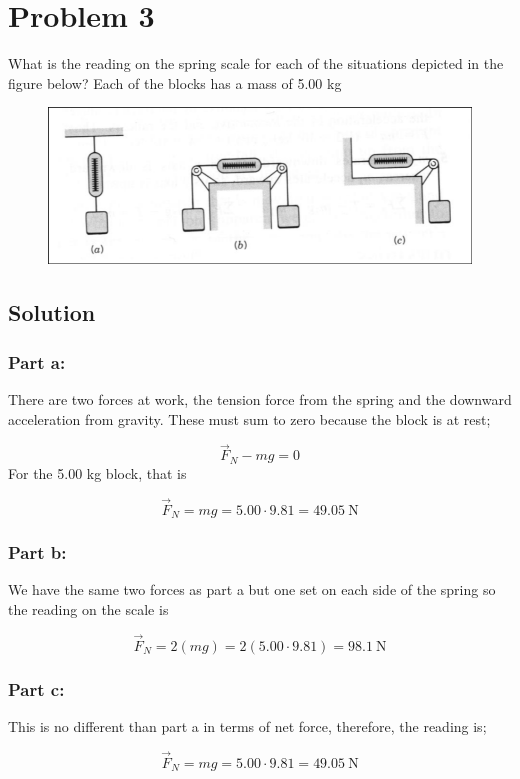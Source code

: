 \documentclass{article}
\begin{document}
\section*{Problem 3}
What is the reading on the spring scale for each of the situations depicted in the figure below? Each of the
blocks has a mass of 5.00 kg
\begin{figure}[ht]
    \centering
    \includegraphics[scale=.3]{drawing-1.png}
\end{figure}

\subsection*{Solution}
\subsubsection*{Part a:}
There are two forces at work, the tension force from the spring and the downward acceleration from gravity. These must sum to zero because the block is at rest;

\[
	\vec{F}_N-mg = 0
\]
For the 5.00 kg block, that is

\[
	\vec{F}_N = mg = 5.00 \cdot 9.81 = 49.05\ \text{N}
\]

\subsubsection*{Part b:}
We have the same two forces as part a but one set on each side of the spring so the reading on the scale is

\[
	\vec{F}_N = 2(mg) = 2(5.00 \cdot 9.81) = 98.1\ \text{N}
\]

\subsubsection*{Part c:}
This is no different than part a in terms of net force, therefore, the reading is;

\[
	\vec{F}_N = mg = 5.00 \cdot 9.81 = 49.05\ \text{N}
\]
\end{document}
